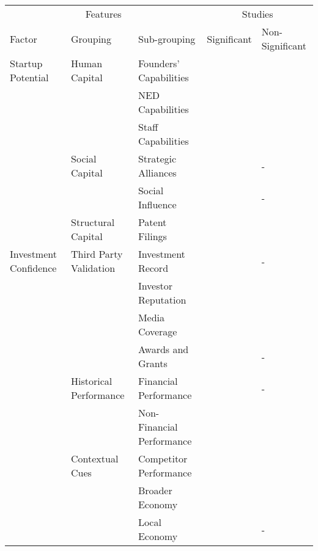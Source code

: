 \begin{tabular}{@{}lllll@{}}
\toprule
\multicolumn{3}{c}{Features} & \multicolumn{2}{c}{Studies} \\
\cmidrule(lr){1-3} \cmidrule(lr){4-5}
Factor & Grouping & Sub-grouping & Significant & Non-Significant \\
\midrule
Startup Potential
      & Human Capital
            & Founders' Capabilities
                  & \cite{beckwith2016,an2015,gimmon2010}
                  & \cite{shan2014,conti2013} \\
      &     & NED Capabilities
                  & \cite{baum2004}
                  & \cite{ahlers2015,an2015} \\
      &     & Staff Capabilities
                  & \cite{beckwith2016,an2015,conti2013}
                  & \cite{ahlers2015} \\
      \cmidrule(r){2-5}
      & Social Capital
            & Strategic Alliances
                  & \cite{baum2004}
                  & - \\
      &     & Social Influence
                  & \cite{beckwith2016,an2015,cheng2016,yu2015}
                  & - \\
      \cmidrule(r){2-5}
      & Structural Capital
            & Patent Filings
                  & \cite{hoenen2014,hsu2008,baum2004}
                  & \cite{ahlers2015,gimmon2010} \\
\midrule
Investment Confidence
      & Third Party Validation
            & Investment Record
                  & \cite{ahlers2015,beckwith2016,croce2016,hoenen2014,conti2013}
                  & - \\
      &     & Investor Reputation
                  & \cite{an2015,werth2013,hsu2008}
                  & \cite{hoenen2014} \\
      &     & Media Coverage
                  & \cite{beckwith2016}
                  & \cite{an2015} \\
      &     & Awards and Grants
                  & \cite{ahlers2015}
                  & - \\
      \cmidrule(r){2-5}
      & Historical Performance
            & Financial Performance
                  & \cite{beckwith2016,baum2004}
                  & - \\
      &     & Non-Financial Performance
                  & \cite{an2015,gimmon2010}
                  & \cite{hoenen2014} \\
      \cmidrule(r){2-5}
      & Contextual Cues
            & Competitor Performance
                  & \cite{shan2014,croce2016,gimmon2010}
                  & \cite{beckwith2016,conti2013} \\
      &     & Broader Economy
                  & \cite{beckwith2016,croce2016,hoenen2014,conti2013,hsu2008}
                  & \cite{shan2014,ahlers2015} \\
      &     & Local Economy
            & \cite{shan2014,beckwith2016,croce2016,gimmon2010,hoenen2014}
            & - \\
\bottomrule
\end{tabular}
